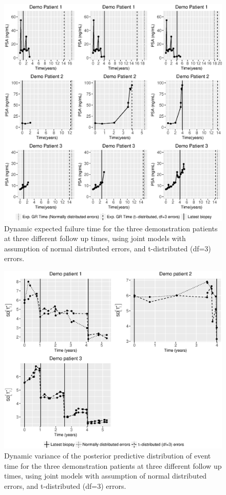 \begin{enumerate}
	\begin{figure}[!htb]
	\centerline{\includegraphics[width=\columnwidth]{images/model_fit/demo_expfail_norm_t3.eps}}
	\caption{Dynamic expected failure time for the three demonstration patients at three different follow up times, using joint models with assumption of normal distributed errors, and t-distributed (df=3) errors.}
	\label{fig : demo_expfail_norm_t3}
	\end{figure}

	\begin{figure}[!htb]
	\centerline{\includegraphics[width=\columnwidth]{images/model_fit/variance_demo_patients.eps}}
	\caption{Dynamic variance of the posterior predictive distribution of event time for the three demonstration patients at three different follow up times, using joint models with assumption of normal distributed errors, and t-distributed (df=3) errors.}
	\label{fig : variance_demo_patients}
	\end{figure}



\end{enumerate}
